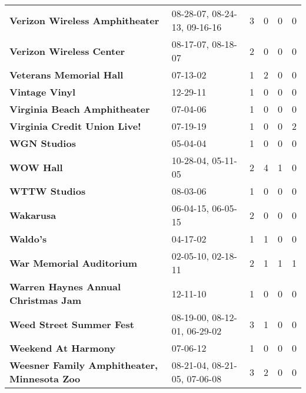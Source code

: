 \begin{supertabular}{llllll}
                               \textbf{Verizon Wireless Amphitheater} &  08-28-07, 08-24-13, 09-16-16 &  3 &   0 &  0 &  0 \\
                                     \textbf{Verizon Wireless Center} &            08-17-07, 08-18-07 &  2 &   0 &  0 &  0 \\
                                      \textbf{Veterans Memorial Hall} &                      07-13-02 &  1 &   2 &  0 &  0 \\
                                               \textbf{Vintage Vinyl} &                      12-29-11 &  1 &   0 &  0 &  0 \\
                                 \textbf{Virginia Beach Amphitheater} &                      07-04-06 &  1 &   0 &  0 &  0 \\
                                 \textbf{Virginia Credit Union Live!} &                      07-19-19 &  1 &   0 &  0 &  2 \\
                                                 \textbf{WGN Studios} &                      05-04-04 &  1 &   0 &  0 &  0 \\
                                                    \textbf{WOW Hall} &            10-28-04, 05-11-05 &  2 &   4 &  1 &  0 \\
                                                \textbf{WTTW Studios} &                      08-03-06 &  1 &   0 &  0 &  0 \\
                                                    \textbf{Wakarusa} &            06-04-15, 06-05-15 &  2 &   0 &  0 &  0 \\
                                                     \textbf{Waldo's} &                      04-17-02 &  1 &   1 &  0 &  0 \\
                                     \textbf{War Memorial Auditorium} &            02-05-10, 02-18-11 &  2 &   1 &  1 &  1 \\
                          \textbf{Warren Haynes Annual Christmas Jam} &                      12-11-10 &  1 &   0 &  0 &  0 \\
                                     \textbf{Weed Street Summer Fest} &  08-19-00, 08-12-01, 06-29-02 &  3 &   1 &  0 &  0 \\
                                          \textbf{Weekend At Harmony} &                      07-06-12 &  1 &   0 &  0 &  0 \\
                  \textbf{Weesner Family Amphitheater, Minnesota Zoo} &  08-21-04, 08-21-05, 07-06-08 &  3 &   2 &  0 &  0 \\

\end{supertabular}
